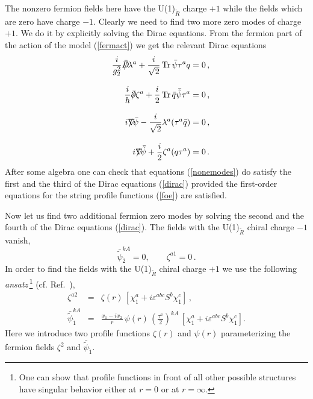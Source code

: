 \documentclass[epsfig,12pt]{article}
\def\beqn{\begin{eqnarray}}
\def\eeqn{\end{eqnarray}}
\def\beq{\begin{equation}}
\def\eeq{\end{equation}}
\newcommand{\pt}{\partial}
\begin{document}
The nonzero fermion fields here have the U(1)$_{\tilde{R}}$ charge $+1$ while the
fields which are zero have charge $-1$. Clearly we need to find two more
zero modes of charge $+1$. We do it by explicitly solving the Dirac equations.
From the fermion part of the action of the model (\ref{fermact}) we get
the relevant Dirac equations 
\beqn
&& \frac{i}{g_2^2} \bar{D}\hspace{-0.65em}/\lambda^{a}
+\frac{i}{\sqrt{2}}\,{\rm Tr}\,
\bar{\psi}\tau^a q=0\, ,
\nonumber\\[3mm]
&& \frac{i}{h} \bar{\pt}\hspace{-0.55em}/\zeta^{a}
+\frac{i}{2}\,{\rm Tr}\,
\bar{q}\bar{\tilde{\psi}}\tau^a =0\, ,
\nonumber\\[3mm]
&& i\nabla\hspace{-0.75em}/ \bar{\psi}-\frac{i}{\sqrt{2}}
\lambda^{a}(\tau^a\bar{q})=0\, ,
\nonumber\\[3mm]
&& i\nabla\hspace{-0.75em}/ \bar{\tilde{\psi}}+
\frac{i}{2}\zeta^{a}(q\tau^a)=0\, .
\label{dirac}
\eeqn
 After some algebra one can check
that equations (\ref{nonemodes}) do  satisfy the first and the third of 
the Dirac equations (\ref{dirac})
provided the first-order equations for the string profile functions (\ref{foe})
are satisfied.

Now let us find two additional fermion zero modes by solving the second and the fourth
of the Dirac equations (\ref{dirac}). The fields with  the U(1)$_{\tilde{R}}$ chiral charge  
$-1$ vanish,
\beq
\bar{\tilde{\psi}}^{kA}_{\dot{2}}=0, \qquad \zeta^{a1}=0\, .
\label{negchirality}
\eeq
In order to find the fields with the U(1)$_{\tilde{R}}$ chiral charge  
$+1$ we use the following {\em ansatz}\,\footnote{One can show that 
profile functions in front of all other possible structures have singular behavior
either at $r=0$ or at $r=\infty$.}  (cf. Ref.~\cite{SYnone}),
\beqn
\zeta^{a2}
&=&
 \zeta(r)\,\left[\chi_1^a+
i\varepsilon^{abc}S^b\chi_1^c\right]\, ,
\nonumber\\[4mm]
\bar{\tilde{\psi}}^{kA}_{\dot{1}}
&=&
\frac{x_1-ix_2}{r}\,\psi(r)\,
\left(\frac{\tau^a}{2}\right)^{kA}\,
\left[\chi_1^a+
i\varepsilon^{abc}S^b\chi_1^c\right].
\label{fprofile}
\eeqn
Here we introduce two profile functions $\zeta(r)$ and $\psi(r)$
parameterizing the fermion fields $\zeta^{2}$ and $\bar{\tilde{\psi}}_{\dot{1}}$.
\end{document}
